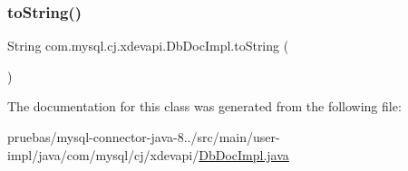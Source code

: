 \subsubsection{\texorpdfstring{to\+String()}{toString()}}
{\footnotesize\ttfamily String com.\+mysql.\+cj.\+xdevapi.\+Db\+Doc\+Impl.\+to\+String (\begin{DoxyParamCaption}{ }\end{DoxyParamCaption})}



The documentation for this class was generated from the following file\+:\begin{DoxyCompactItemize}
\item 
pruebas/mysql-\/connector-\/java-\/8../src/main/user-\/impl/java/com/mysql/cj/xdevapi/\mbox{\hyperlink{_db_doc_impl_8java}{Db\+Doc\+Impl.\+java}}\end{DoxyCompactItemize}
